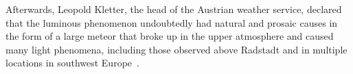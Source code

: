 


Afterwards, Leopold Kletter, the head of the Austrian weather service, declared that the luminous phenomenon undoubtedly had natural and prosaic causes in the form of a large meteor that broke up in the upper atmosphere and caused many light phenomena,
including those observed above Radstadt and in multiple locations in southwest Europe~\cite{Raab-Kletter-Linz}.

